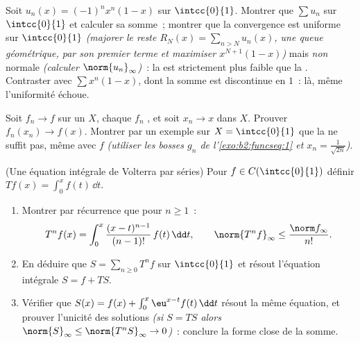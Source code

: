 \begin{exercise}[$\star$]\label{exo:b2:funcseq:10}
Soit $u_n(x) = (-1)^n x^n(1 - x)$ sur $\intcc{0}{1}$. Montrer que
$\sum u_n$   sur $\intcc{0}{1}$ et calculer sa
somme~; montrer que la convergence est uniforme sur $\intcc{0}{1}$
\emph{(majorer le reste $R_N(x) = \sum_{n > N} u_n(x)$, une
queue géométrique, par son premier terme et maximiser $x^{N+1}(1-x)$)}
mais \emph{non} normale \emph{(calculer $\norm{u_n}_\infty$)}~:
la  est strictement plus faible que la . Contraster avec $\sum x^n(1-x)$, dont la somme est
discontinue en $1$~: là, même l'uniformité échoue.
\end{exercise}

\begin{exercise}[$\star\star$]\label{exo:b2:funcseq:11}
Soit $f_n \to f$  sur un  $X$, chaque $f_n$
, et soit $x_n \to x$ dans $X$. Prouver $f_n(x_n) \to
f(x)$. Montrer par un exemple sur $X = \intcc{0}{1}$ que la
 ne suffit pas, même avec $f$ 
\emph{(utiliser les bosses $g_n$ de l'\cref{exo:b2:funcseq:1} et $x_n =
\frac{1}{\sqrt{2n}}$)}.
\end{exercise}

\begin{exercise}[$\star\star\star$]\label{exo:b2:funcseq:12}
(Une équation intégrale de Volterra par séries) Pour $f \in
C(\intcc{0}{1})$ définir $Tf(x) = \int_0^x f(t)\,\dd t$.
\begin{enumerate}
  \item Montrer par récurrence que pour $n \geq 1$~:
        \[
        T^n f(x) = \int_0^x \frac{(x -
        t)^{n-1}}{(n-1)!}\,f(t)\,\dd t,
        \qquad
        \norm{T^n f}_\infty \leq \frac{\norm f_\infty}{n!} .
        \]
  \item En déduire que $S = \sum_{n\geq0} T^n f$  
        sur $\intcc{0}{1}$ et résout l'équation intégrale $S = f
        + TS$.
  \item Vérifier que $S(x) = f(x) + \int_0^x \eu^{x-t}f(t)\,\dd
        t$ résout la même équation, et prouver l'unicité des
        solutions  \emph{(si $S = TS$ alors
        $\norm{S}_\infty \leq \norm{T^nS}_\infty \to 0$)}~:
        conclure la forme close de la somme.
\end{enumerate}
\end{exercise}

